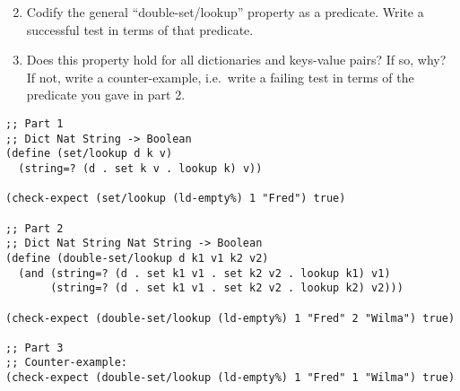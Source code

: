 \documentclass[12pt]{article}                   %
\newenvironment{solution}{}{}
\begin{document}
\begin{problem}
\begin{enumerate}
\setcounter{enumi}{1}
\item Codify the general ``double-set/lookup'' property as a
  predicate.  Write a successful test in terms of that predicate.

\item Does this property hold for all dictionaries and keys-value
  pairs?  If so, why?  If not, write a counter-example, i.e.~write a
  failing test in terms of the predicate you gave in part 2.
\end{enumerate}

\ifrubric\else
{}
\newpage
\fi
\end{problem}

\begin{solution}
\begin{verbatim}
;; Part 1
;; Dict Nat String -> Boolean
(define (set/lookup d k v)
  (string=? (d . set k v . lookup k) v))

(check-expect (set/lookup (ld-empty%) 1 "Fred") true)

;; Part 2
;; Dict Nat String Nat String -> Boolean
(define (double-set/lookup d k1 v1 k2 v2)
  (and (string=? (d . set k1 v1 . set k2 v2 . lookup k1) v1)
       (string=? (d . set k1 v1 . set k2 v2 . lookup k2) v2)))

(check-expect (double-set/lookup (ld-empty%) 1 "Fred" 2 "Wilma") true)

;; Part 3
;; Counter-example:
(check-expect (double-set/lookup (ld-empty%) 1 "Fred" 1 "Wilma") true)
\end{verbatim}
\end{solution}
\end{document}
